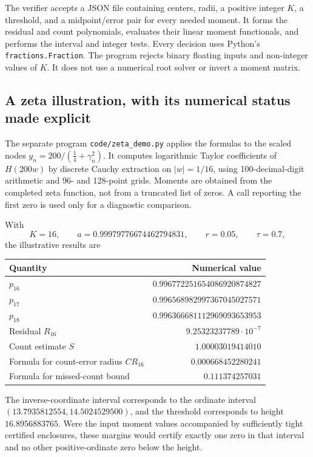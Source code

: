 The verifier accepts a JSON file containing centers, radii, a positive
integer $K$, a threshold, and a midpoint/error pair for every needed moment.
It forms the residual and count polynomials, evaluates their linear
moment functionals, and performs the interval and integer tests.
Every decision uses Python's \texttt{fractions.Fraction}. The program
rejects binary floating inputs and non-integer values of $K$.
It does not use a numerical root solver or invert a moment matrix.

\subsection{A zeta illustration, with its numerical status made explicit}

The separate program \texttt{code/zeta\_demo.py} applies the formulas to
the scaled nodes $y_n=200/(\tfrac14+\gamma_n^2)$.
It computes logarithmic Taylor coefficients of $H(200w)$ by discrete
Cauchy extraction on $|w|=1/16$, using 100-decimal-digit arithmetic and
96- and 128-point grids. Moments are obtained from the completed zeta
function, not from a truncated list of zeros. A call reporting the first
zero is used only for a diagnostic comparison.

With
\[
 K=16,\qquad a=0.99979776674462794831,\qquad
 r=0.05,\qquad \tau=0.7,
\]
the illustrative results are
\begin{center}
\begin{tabular}{@{}lr@{}}
\toprule
Quantity & Numerical value\\
\midrule
$p_{16}$ & $0.996772251654086920874827$\\
$p_{17}$ & $0.996568982997367045027571$\\
$p_{18}$ & $0.996366681112969093653953$\\
Residual $R_{16}$ & $9.25323237789\cdot10^{-7}$\\
Count estimate $S$ & $1.00003019414010$\\
Formula for count-error radius $CR_{16}$ & $0.000668452280241$\\
Formula for missed-count bound & $0.111374257031$\\
\bottomrule
\end{tabular}
\end{center}
The inverse-coordinate interval corresponds to the ordinate interval
$(13.7935812554,14.5024529500)$, and the threshold corresponds to height
$16.8956883765$. Were the input moment values accompanied by sufficiently
tight certified enclosures, these margins would certify exactly one zero
in that interval and no other positive-ordinate zero below the height.

